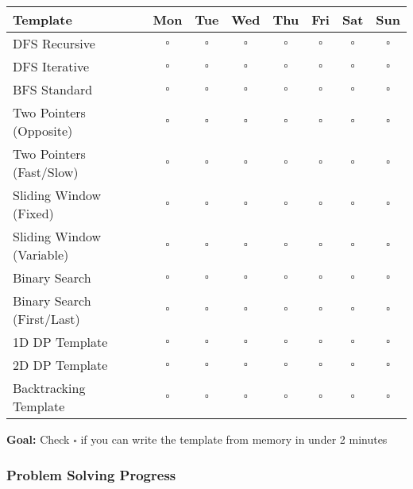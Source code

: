\documentclass[10pt,a4paper]{article}
\begin{document}
\begin{table}[h]
\centering
\begin{tabular}{|p{4cm}|c|c|c|c|c|c|c|}
\hline
\textbf{Template} & \textbf{Mon} & \textbf{Tue} & \textbf{Wed} & \textbf{Thu} & \textbf{Fri} & \textbf{Sat} & \textbf{Sun} \\
\hline
DFS Recursive & $\square$ & $\square$ & $\square$ & $\square$ & $\square$ & $\square$ & $\square$ \\
\hline
DFS Iterative & $\square$ & $\square$ & $\square$ & $\square$ & $\square$ & $\square$ & $\square$ \\
\hline
BFS Standard & $\square$ & $\square$ & $\square$ & $\square$ & $\square$ & $\square$ & $\square$ \\
\hline
Two Pointers (Opposite) & $\square$ & $\square$ & $\square$ & $\square$ & $\square$ & $\square$ & $\square$ \\
\hline
Two Pointers (Fast/Slow) & $\square$ & $\square$ & $\square$ & $\square$ & $\square$ & $\square$ & $\square$ \\
\hline
Sliding Window (Fixed) & $\square$ & $\square$ & $\square$ & $\square$ & $\square$ & $\square$ & $\square$ \\
\hline
Sliding Window (Variable) & $\square$ & $\square$ & $\square$ & $\square$ & $\square$ & $\square$ & $\square$ \\
\hline
Binary Search & $\square$ & $\square$ & $\square$ & $\square$ & $\square$ & $\square$ & $\square$ \\
\hline
Binary Search (First/Last) & $\square$ & $\square$ & $\square$ & $\square$ & $\square$ & $\square$ & $\square$ \\
\hline
1D DP Template & $\square$ & $\square$ & $\square$ & $\square$ & $\square$ & $\square$ & $\square$ \\
\hline
2D DP Template & $\square$ & $\square$ & $\square$ & $\square$ & $\square$ & $\square$ & $\square$ \\
\hline
Backtracking Template & $\square$ & $\square$ & $\square$ & $\square$ & $\square$ & $\square$ & $\square$ \\
\hline
\end{tabular}
\end{table}

\textbf{Goal:} Check $\square$ if you can write the template from memory in under 2 minutes

\subsubsection{Problem Solving Progress}
\end{document}
